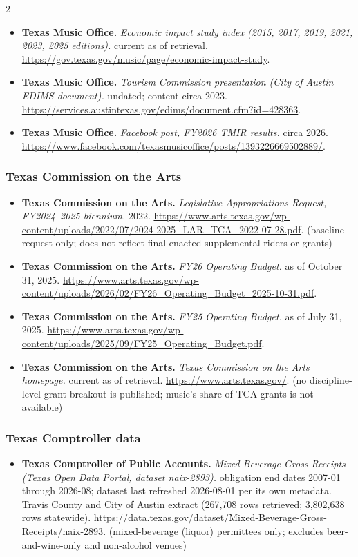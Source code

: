 {\begin{multicols}{2}
\begin{itemize}[itemsep=0pt,topsep=1pt,parsep=0pt,partopsep=0pt,leftmargin=1em]
\item \textbf{Texas Music Office.} \textit{Economic impact study index (2015, 2017, 2019, 2021, 2023, 2025 editions).} current as of retrieval. \url{https://gov.texas.gov/music/page/economic-impact-study}.
\item \textbf{Texas Music Office.} \textit{Tourism Commission presentation (City of Austin EDIMS document).} undated; content circa 2023. \url{https://services.austintexas.gov/edims/document.cfm?id=428363}.
\item \textbf{Texas Music Office.} \textit{Facebook post, FY2026 TMIR results.} circa 2026. \url{https://www.facebook.com/texasmusicoffice/posts/1393226669502889/}.
\end{itemize}
\subsubsection*{Texas Commission on the Arts}
\begin{itemize}[itemsep=0pt,topsep=1pt,parsep=0pt,partopsep=0pt,leftmargin=1em]
\item \textbf{Texas Commission on the Arts.} \textit{Legislative Appropriations Request, FY2024--2025 biennium.} 2022. \url{https://www.arts.texas.gov/wp-content/uploads/2022/07/2024-2025_LAR_TCA_2022-07-28.pdf}. {\color{ammuted}(baseline request only; does not reflect final enacted supplemental riders or grants)}
\item \textbf{Texas Commission on the Arts.} \textit{FY26 Operating Budget.} as of October 31, 2025. \url{https://www.arts.texas.gov/wp-content/uploads/2026/02/FY26_Operating_Budget_2025-10-31.pdf}.
\item \textbf{Texas Commission on the Arts.} \textit{FY25 Operating Budget.} as of July 31, 2025. \url{https://www.arts.texas.gov/wp-content/uploads/2025/09/FY25_Operating_Budget.pdf}.
\item \textbf{Texas Commission on the Arts.} \textit{Texas Commission on the Arts homepage.} current as of retrieval. \url{https://www.arts.texas.gov/}. {\color{ammuted}(no discipline-level grant breakout is published; music’s share of TCA grants is not available)}
\end{itemize}
\subsubsection*{Texas Comptroller data}
\begin{itemize}[itemsep=0pt,topsep=1pt,parsep=0pt,partopsep=0pt,leftmargin=1em]
\item \textbf{Texas Comptroller of Public Accounts.} \textit{Mixed Beverage Gross Receipts (Texas Open Data Portal, dataset naix-2893).} obligation end dates 2007-01 through 2026-08; dataset last refreshed 2026-08-01 per its own metadata. Travis County and City of Austin extract (267,708 rows retrieved; 3,802,638 rows statewide). \url{https://data.texas.gov/dataset/Mixed-Beverage-Gross-Receipts/naix-2893}. {\color{ammuted}(mixed-beverage (liquor) permittees only; excludes beer-and-wine-only and non-alcohol venues)}
\end{itemize}
\end{multicols}
}

